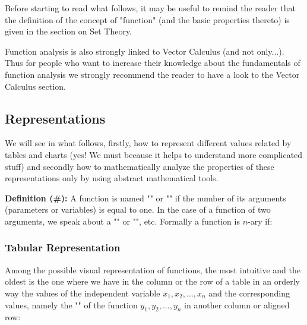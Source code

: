 	\begin{tcolorbox}[title=Remark,colframe=black,arc=10pt]
Before starting to read what follows, it may be useful to remind the reader that the definition of the concept of "function" (and the basic properties thereto) is given in the section on Set Theory.
	\end{tcolorbox}	

	Function analysis is also strongly linked to Vector Calculus (and not only...). Thus for people who want to increase their knowledge about the fundamentals of function analysis we strongly recommend the reader to have a look to the Vector Calculus section.

\pagebreak
\subsection{Representations}

	We will see in what follows, firstly, how to represent different values related by tables and charts (yes! We must because it helps to understand more complicated stuff) and secondly how to mathematically analyze the properties of these representations only by using abstract mathematical tools.

	\textbf{Definition (\#\mydef):} A function is named "" or  "" if the number of its arguments (parameters or variables) is equal to one. In the case of a function of two arguments, we speak about a "" or "", etc. Formally a function is $n$-ary if:
	

\subsubsection{Tabular Representation}

Among the possible visual representation of functions, the most intuitive and the oldest is the one where we have in the column or the row of a table in an orderly way the values of the independent variable $x_1,x_2,...,x_n$ and the corresponding values, namely the "" of the function $y_1,y_2,...,y_n$ in another column or aligned row:

